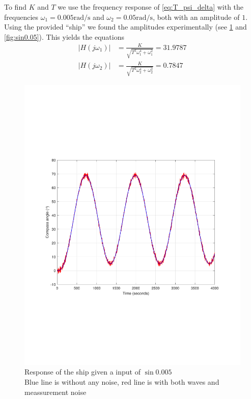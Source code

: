 To find $K$ and $T$ we use the frequency response of \cref{eq:T_psi_delta} with the frequencies $\omega_1 = 0.005\si{\radian\per\second}$ and $\omega_2 = 0.05\si{\radian\per\second}$, both with an amplitude of $1$. Using the provided ``ship'' we found the amplitudes experimentally (see \cref{fig:sin0.005} and \cref{fig:sin0.05}). This yields the equations
\begin{subequations}
	\begin{align}
		|H(j\omega_1)| &= \frac{K}{\sqrt{T^2\omega_1^4 + \omega_1^2}} = 31.9787 \label{eq:omega_1}\\
		|H(j\omega_2)| &= \frac{K}{\sqrt{T^2\omega_2^4 + \omega_2^2}} = 0.7847 \label{eq:omega_2}
	\end{align}
\end{subequations}

\begin{figure}
	\centering
	\includegraphics[width=\textwidth]{images/oppg1/sin0005.pdf}
	\caption{Response of the ship given a input of $\sin{0.005}$\\
	Blue line is without any noise, red line is with both waves and meassurement noise}
	\label{fig:sin0.005}
\end{figure}

